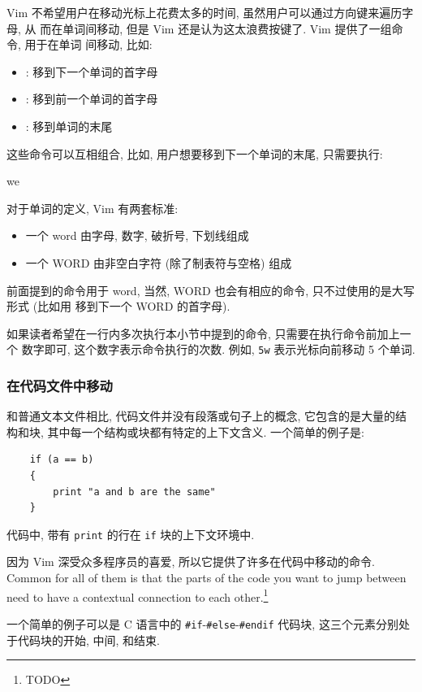 Vim 不希望用户在移动光标上花费太多的时间, 虽然用户可以通过方向键来遍历字母, 从
而在单词间移动, 但是 Vim 还是认为这太浪费按键了. Vim 提供了一组命令, 用于在单词
间移动, 比如:
\begin{itemize}
    \item {}: 移到下一个单词的首字母
    \item {}: 移到前一个单词的首字母
    \item {}: 移到单词的末尾
\end{itemize}
这些命令可以互相组合, 比如, 用户想要移到下一个单词的末尾, 只需要执行:
\begin{vimcmd}
we
\end{vimcmd}

对于单词的定义, Vim 有两套标准:
\begin{itemize}
    \item 一个 word 由字母, 数字, 破折号, 下划线组成
    \item 一个 WORD 由非空白字符 (除了制表符与空格) 组成
\end{itemize}
前面提到的命令用于 word, 当然, WORD 也会有相应的命令, 只不过使用的是大写形式
(比如用  移到下一个 WORD 的首字母).
\begin{warning}
    如果读者希望在一行内多次执行本小节中提到的命令, 只需要在执行命令前加上一个
    数字即可, 这个数字表示命令执行的次数. 例如, \texttt{5w} 表示光标向前移动 5
    个单词.
\end{warning}

\subsubsection{在代码文件中移动}
\label{subsubsec:moving_in_a_code_file}

和普通文本文件相比, 代码文件并没有段落或句子上的概念, 它包含的是大量的结构和块,
其中每一个结构或块都有特定的上下文含义. 一个简单的例子是:
\begin{verbatim}
    if (a == b)
    {
        print "a and b are the same"
    }
\end{verbatim}
代码中, 带有 \texttt{print} 的行在 \texttt{if} 块的上下文环境中.

因为 Vim 深受众多程序员的喜爱, 所以它提供了许多在代码中移动的命令. Common for
all of them is that the parts of the code you want to jump between need to have
a contextual connection to each other.\footnote{TODO}

一个简单的例子可以是 C 语言中的 \texttt{#if}-\texttt{#else}-\texttt{#endif}
代码块, 这三个元素分别处于代码块的开始, 中间, 和结束.


